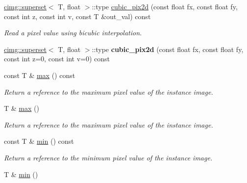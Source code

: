 \begin{DoxyCompactItemize}
\item 
\hyperlink{structcimg__library_1_1cimg_1_1superset}{cimg\-::superset}$<$ T, float $>$\-::type \hyperlink{structcimg__library_1_1_c_img_ab26403a66e670b53ef8f706fe83247a7}{cubic\-\_\-pix2d} (const float fx, const float fy, const int z, const int v, const T \&out\-\_\-val) const 
\begin{DoxyCompactList}\small\item\em Read a pixel value using bicubic interpolation. \end{DoxyCompactList}\item 
\hypertarget{structcimg__library_1_1_c_img_a8e1c9ed72095e46ca1317c484deb0c71}{\hyperlink{structcimg__library_1_1cimg_1_1superset}{cimg\-::superset}$<$ T, float $>$\-::type {\bfseries cubic\-\_\-pix2d} (const float fx, const float fy, const int z=0, const int v=0) const }\label{structcimg__library_1_1_c_img_a8e1c9ed72095e46ca1317c484deb0c71}

\item 
\hypertarget{structcimg__library_1_1_c_img_a4ed81efb50c6fc79bbc4980d501b87d1}{const T \& \hyperlink{structcimg__library_1_1_c_img_a4ed81efb50c6fc79bbc4980d501b87d1}{max} () const }\label{structcimg__library_1_1_c_img_a4ed81efb50c6fc79bbc4980d501b87d1}

\begin{DoxyCompactList}\small\item\em Return a reference to the maximum pixel value of the instance image. \end{DoxyCompactList}\item 
\hypertarget{structcimg__library_1_1_c_img_ab66f02da84b65b4efe498ccbd3bfdec6}{T \& \hyperlink{structcimg__library_1_1_c_img_ab66f02da84b65b4efe498ccbd3bfdec6}{max} ()}\label{structcimg__library_1_1_c_img_ab66f02da84b65b4efe498ccbd3bfdec6}

\begin{DoxyCompactList}\small\item\em Return a reference to the maximum pixel value of the instance image. \end{DoxyCompactList}\item 
\hypertarget{structcimg__library_1_1_c_img_a6f6b87ed92f562c901433d794a15054a}{const T \& \hyperlink{structcimg__library_1_1_c_img_a6f6b87ed92f562c901433d794a15054a}{min} () const }\label{structcimg__library_1_1_c_img_a6f6b87ed92f562c901433d794a15054a}

\begin{DoxyCompactList}\small\item\em Return a reference to the minimum pixel value of the instance image. \end{DoxyCompactList}\item 
\hypertarget{structcimg__library_1_1_c_img_a592bf56c96e82fc327c91c904798fc8d}{T \& \hyperlink{structcimg__library_1_1_c_img_a592bf56c96e82fc327c91c904798fc8d}{min} ()}\label{structcimg__library_1_1_c_img_a592bf56c96e82fc327c91c904798fc8d}


\end{DoxyCompactItemize}
